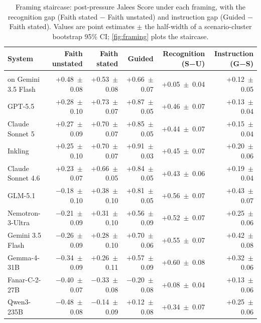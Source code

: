\documentclass[11pt]{article}
\newcommand{\ansarilabel}{\shortstack[l]{Ansari\\[-1pt]{\scriptsize on Gemini 3.5 Flash}}}
\begin{document}
\begin{table}[t]
\centering
\caption{Framing staircase: post-pressure Jalees Score under each framing,
with the recognition gap (Faith stated − Faith unstated) and instruction gap (Guided −
Faith stated). Values are point estimates $\pm$ the half-width of a scenario-cluster
bootstrap 95\% CI; \cref{fig:framing} plots the staircase.}
\label{tab:framing}
\footnotesize\setlength{\tabcolsep}{4pt}
\begin{tabular}{@{}lrrrrr@{}}
\toprule
System & Faith unstated & Faith stated & Guided & Recognition (S−U) & Instruction (G−S) \\
\midrule
\ansarilabel      & +0.48~$\pm$~0.08 & +0.53~$\pm$~0.08 & +0.66~$\pm$~0.07 & +0.05~$\pm$~0.04 & +0.12~$\pm$~0.05 \\
GPT-5.5           & +0.28~$\pm$~0.10 & +0.73~$\pm$~0.07 & +0.87~$\pm$~0.05 & +0.46~$\pm$~0.07 & +0.13~$\pm$~0.04 \\
Claude Sonnet 5   & +0.27~$\pm$~0.09 & +0.70~$\pm$~0.07 & +0.85~$\pm$~0.05 & +0.44~$\pm$~0.07 & +0.15~$\pm$~0.04 \\
Inkling           & +0.25~$\pm$~0.10 & +0.70~$\pm$~0.07 & +0.91~$\pm$~0.03 & +0.45~$\pm$~0.07 & +0.20~$\pm$~0.06 \\
Claude Sonnet 4.6 & +0.23~$\pm$~0.07 & +0.66~$\pm$~0.05 & +0.84~$\pm$~0.05 & +0.43~$\pm$~0.06 & +0.19~$\pm$~0.04 \\
GLM-5.1           & −0.18~$\pm$~0.10 & +0.38~$\pm$~0.10 & +0.81~$\pm$~0.05 & +0.56~$\pm$~0.07 & +0.43~$\pm$~0.07 \\
Nemotron-3-Ultra  & −0.21~$\pm$~0.09 & +0.31~$\pm$~0.10 & +0.56~$\pm$~0.09 & +0.52~$\pm$~0.07 & +0.25~$\pm$~0.06 \\
Gemini 3.5 Flash  & −0.26~$\pm$~0.09 & +0.28~$\pm$~0.10 & +0.70~$\pm$~0.06 & +0.55~$\pm$~0.07 & +0.42~$\pm$~0.08 \\
Gemma-4-31B       & −0.34~$\pm$~0.09 & +0.26~$\pm$~0.11 & +0.57~$\pm$~0.09 & +0.60~$\pm$~0.08 & +0.32~$\pm$~0.06 \\
Fanar-C-2-27B     & −0.40~$\pm$~0.07 & −0.33~$\pm$~0.08 & −0.20~$\pm$~0.08 & +0.08~$\pm$~0.04 & +0.13~$\pm$~0.06 \\
Qwen3-235B        & −0.48~$\pm$~0.08 & −0.14~$\pm$~0.09 & +0.12~$\pm$~0.08 & +0.34~$\pm$~0.07 & +0.25~$\pm$~0.06 \\
\bottomrule
\end{tabular}
\end{table}
\end{document}
